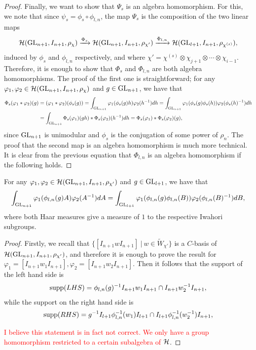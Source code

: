 \begin{proof}
        Finally, we want to show that $\Psi_s$ is an algebra homomorphism. For this, we note that since $\psi_s=\phi_s\circ\phi_{l,n}$, the map $\Psi_s$ is the composition of the two linear maps
        \begin{equation*}
            \mathcal{H}(\mathrm{GL}_{n+1},I_{n+1},\rho_\chi)\xrightarrow{\Phi_s}\mathcal{H}(\mathrm{GL}_{n+1},I_{n+1},\rho_{\chi'})\xrightarrow{\Phi_{l,n}}\mathcal{H}(\mathrm{GL}_{l+1},I_{n+1},\rho_{\chi^{(s)}}),
        \end{equation*}
        induced by $\phi_s$ and $\phi_{l,n}$ respectively, and where $\chi'=\chi^{(s)}\otimes\chi_{j+1}\otimes\cdots\otimes\chi_{i-1}$. Therefore, it is enough to show that $\Phi_s$ and $\Phi_{l,n}$ are both algebra homomorphisms. The proof of the first one is straightforward; for any $\varphi_1,\varphi_2\in\mathcal{H}(\mathrm{GL}_{n+1},I_{n+1},\rho_\chi)$ and $g\in\mathrm{GL}_{n+1}$, we have that 
        \begin{align*}
            \Phi_s(\varphi_1*\varphi_2)(g)&=(\varphi_1*\varphi_2)(\phi_s(g))=\int_{\mathrm{GL}_{n+1}}\varphi_1(\phi_s(g)h)\varphi_2(h^{-1})dh
            =\int_{\mathrm{GL}_{n+1}}\varphi_1(\phi_s(g)\phi_s(h))\varphi_2(\phi_s(h)^{-1})dh\\
            &=\int_{\mathrm{GL}_{n+1}}\Phi_s(\varphi_1)(gh)*\Phi_s(\varphi_2)(h^{-1})dh=\Phi_s(\varphi_1)*\Phi_s(\varphi_2)(g),
        \end{align*}
        since $\mathrm{GL}_{n+1}$ is unimodular and $\phi_s$ is the conjugation of some power of $\rho_n$. The proof that the second map is an algebra homomorphism is much more technical. It is clear from the previous equation that $\Phi_{l,n}$ is an algebra homomorphism if the following holds.
    \end{proof}


        \begin{lemma}
            For any $\varphi_1,\varphi_2\in\mathcal{H}(\mathrm{GL}_{n+1},I_{n+1},\rho_{\chi'})$ and $g\in\mathrm{GL}_{l+1}$, we have that
            \begin{equation*}
                \int_{\mathrm{GL}_{n+1}}\varphi_1(\phi_{l,n}(g)A)\varphi_2(A^{-1})dA=\int_{\mathrm{GL}_{l+1}}\varphi_1(\phi_{l,n}(g)\phi_{l,n}(B))\varphi_2(\phi_{l,n}(B)^{-1})dB,
            \end{equation*}
            where both Haar measures give a measure of $1$ to the respective Iwahori subgroups.
        \end{lemma}
        \begin{proof}
            Firstly, we recall that $\{[I_{n+1}wI_{n+1}]\ |\ w\in\widetilde{W}_{\chi'}\}$ is a $C$-basis of $\mathcal{H}(\mathrm{GL}_{n+1},I_{n+1},\rho_{\chi'})$, and therefore it is enough to prove the result for $\varphi_1=[I_{n+1}w_1I_{n+1}], \varphi_2=[I_{n+1}w_2I_{n+1}]$. Then it follows that the support of the left hand side is 
            $$\mathrm{supp}(LHS)=\phi_{l,n}(g)^{-1}I_{n+1}w_1I_{n+1}\cap I_{n+1}w_2^{-1}I_{n+1},$$
            while the support on the right hand side is 
            $$\mathrm{supp}(RHS)=g^{-1}I_{l+1}\phi_{l,n}^{-1}(w_1)I_{l+1}\cap I_{l+1}\phi_{l,n}^{-1}(w_2^{-1})I_{n+1},$$

            \textcolor{red}{I believe this statement is in fact not correct. We only have a group homomorphism restricted to a certain subalgebra of $\mathcal{H}$}.
        \end{proof}
    \fi

